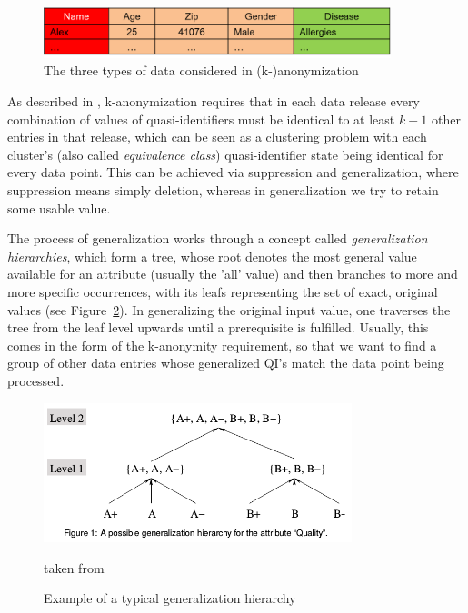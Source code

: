 \documentclass{llncs}
\begin{document}
\begin{figure}[!t]
	\begin{center}
		\includegraphics[width=0.9\textwidth]{figures/anonym/3typesofdata}
		\caption{The three types of data considered in (k-)anonymization}
		\label{fig:anon_categories}
	\end{center}
\end{figure}

As described in \cite{ciriani2007kappa}, k-anonymization requires that in each data release every combination of values of quasi-identifiers must be identical to at least $k-1$ other entries in that release, which can be seen as a clustering problem with each cluster's (also called \textit{equivalence class}) quasi-identifier state being identical for every data point. This can be achieved via suppression and generalization, where suppression means simply deletion, whereas in generalization we try to retain some usable value.

The process of generalization works through a concept called \textit{generalization hierarchies}, which form a tree, whose root denotes the most general value available for an attribute (usually the 'all' value) and then branches to more and more specific occurrences, with its leafs representing the set of exact, original values (see Figure~\ref{fig:gen_hierarchy}). In generalizing the original input value, one traverses the tree from the leaf level upwards until a prerequisite is fulfilled. Usually, this comes in the form of the k-anonymity requirement, so that we want to find a group of other data entries whose generalized QI's match the data point being processed.

\begin{figure}[!t]
	\begin{center}
		\includegraphics[width=0.8\textwidth]{figures/anonym/gen_hierarchy}
		\caption{Example of a typical generalization hierarchy}
		\label{fig:gen_hierarchy}
		\small
		taken from \cite{aggarwal2005approximation}
	\end{center}
\end{figure}
\end{document}
